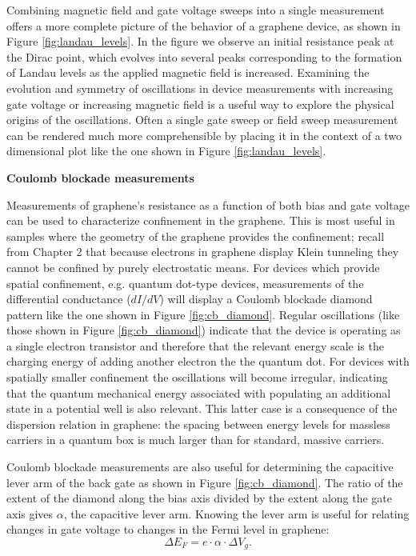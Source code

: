 \documentclass[edeposit,fullpage,draftthesis]{uiucthesis2009}
\begin{document}
            Combining magnetic field and gate voltage sweeps into a single measurement offers a more complete picture
            of the behavior of a graphene device, as shown in Figure \ref{fig:landau_levels}. 
            In the figure we observe an initial resistance peak at the Dirac point, which evolves into several
            peaks corresponding to the formation of Landau levels as the applied magnetic field is increased.
            Examining the evolution and symmetry of oscillations in device measurements with increasing
            gate voltage or increasing magnetic field is a useful way to explore the physical origins of the oscillations.
            Often a single gate sweep or field sweep measurement can be rendered much more comprehensible by
            placing it in the context of a two dimensional plot like the one shown in Figure \ref{fig:landau_levels}.
            
           
            \textbf{Coulomb blockade measurements}
            
            Measurements of graphene's resistance as a function of both bias and gate voltage can be used to
            characterize confinement in the graphene. This is most useful in samples where the geometry
            of the graphene provides the confinement; recall from Chapter 2 that because electrons in graphene
            display Klein tunneling they cannot be confined by purely electrostatic means.
            For devices which provide spatial confinement, e.g. quantum dot-type devices, measurements
            of the differential conductance ($dI/dV$) will display a Coulomb blockade diamond pattern
            like the one shown in Figure \ref{fig:cb_diamond}.
            Regular oscillations (like those shown in Figure \ref{fig:cb_diamond}) indicate that the device
            is operating as a single electron transistor
            and therefore that the relevant energy scale is the charging energy of adding another electron the the quantum dot.
            For devices with spatially smaller confinement the oscillations will become irregular, indicating 
            that the quantum mechanical energy associated with populating an additional state in a potential well
            is also relevant. This latter case is a consequence of the dispersion relation in graphene: the spacing
            between energy levels for massless carriers in a quantum box is much larger than for standard, massive carriers.
            
            Coulomb blockade measurements are also useful for determining the capacitive lever arm of the 
            back gate as shown in Figure \ref{fig:cb_diamond}. The ratio of the extent of the diamond along
            the bias axis divided by the extent along the gate axis gives $\alpha$, the capacitive lever arm.
            Knowing the lever arm is useful for relating changes in gate voltage to changes in the Fermi level
            in graphene:
            \begin{equation}
                \Delta E_F = e \cdot \alpha \cdot \Delta V_g .
            \end{equation}
            
\end{document}
